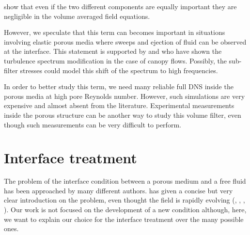 \citet{breugem2006influence} show that even if the two different components are equally important they are negligible in the volume averaged field equations.

%

However, we speculate that this term can becomes important in situations involving elastic porous media where sweeps and ejection of fluid can be observed at the interface.
This statement is supported by \citet{finnigan2000turbulence} and \citet{de2008effects} who have shown the turbulence spectrum modification in the case of canopy flows. Possibly, the sub-filter stresses could model this shift of the spectrum to high frequencies.

In order to better study this term, we need many reliable full DNS inside the porous media at high pore Reynolds number. However, such simulations are very expensive and almost absent from the literature.
Experimental measurements inside the porous structure can be another way to study this volume filter, even though such measurements can be very difficult to perform.

\section{Interface treatment}
\label{ch:interface}

The problem of the interface condition between a porous medium and a free fluid has been approached by many different authors. \citet{ehrhardt2010interface} has given a concise but very clear introduction on the problem, even thought the field is rapidly evolving (\citet{minale2014momentum}, \citet{angot2017asymptotic}, \citet{lacis2017framework}, \citet{zampogna2017new}).
Our work is not focused on the development of a new condition although, here, we want to explain our choice for the interface treatment over the many possible ones.

